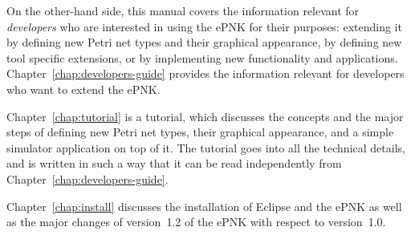 On the other-hand side, this manual covers the information relevant for
\emph{developers}%
who are interested in using the ePNK for their
purposes: extending it by defining new Petri net types and their graphical
appearance, by defining new tool specific extensions, or by implementing
new functionality and applications. Chapter~\ref{chap:developers-guide} provides
the information relevant for developers who want to extend the ePNK.

Chapter~\ref{chap:tutorial} is a tutorial, which discusses the concepts
and the major steps of defining new Petri net types, their graphical
appearance, and a simple simulator application on top of it. The tutorial
goes into all the technical details, and is written in such a way that
it can be read independently from Chapter~\ref{chap:developers-guide}.

Chapter~\ref{chap:install} discusses the installation of Eclipse and
the ePNK as well as the major changes of version~1.2 of the ePNK 
with respect to version~1.0.


  